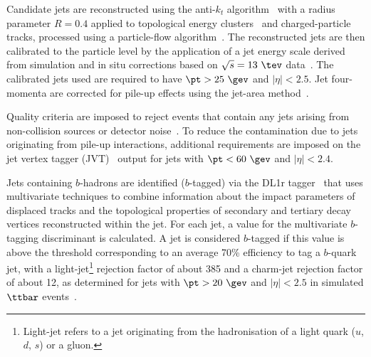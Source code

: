 \documentclass[PAPER, coverpage, atlasdraft=true, texlive=2016, UKenglish]{\ATLASLATEXPATH atlasdoc}
\begin{document}
Candidate jets are reconstructed using the anti-$k_t$ algorithm~\cite{Cacciari:2008gp,Cacciari:2005hq} with a
radius parameter $R=0.4$ applied to topological energy clusters~\cite{Aad:2016upy} and charged-particle tracks, processed using
a particle-flow algorithm~\cite{Aad:2017epj77}. %
The reconstructed jets are then calibrated to the particle level by the application of a jet energy scale 
derived from simulation and in situ corrections based on $\sqrt{s}=13~\tev$ data~\cite{Aaboud:2017jcu}. %
The calibrated jets used are required to have $\pt > 25~\gev$ and $|\eta| < 2.5$.
Jet four-momenta are corrected for pile-up effects using the jet-area method~\cite{Cacciari:2008gn}.

Quality criteria are imposed to reject events that contain any jets arising from non-collision sources
or detector noise~\cite{ATLAS-CONF-2015-029}.  To reduce the contamination due to jets originating from pile-up interactions,
additional requirements are imposed on the jet vertex tagger (JVT)~\cite{Aad:2015ina} output for jets with $\pt<60~\gev$ and $|\eta| < 2.4$.

Jets containing $b$-hadrons are identified ($b$-tagged) via the DL1r tagger~\cite{Aad:2019epj79,ATL-PHYS-PUB-2017-013} %
that uses multivariate techniques to combine information about the impact parameters of displaced tracks and the  topological properties 
of secondary and tertiary decay vertices reconstructed within the jet. For each jet, a value for the multivariate $b$-tagging discriminant is 
calculated. A jet is considered $b$-tagged if this value is above the threshold corresponding to
an average 70\% efficiency to tag a $b$-quark jet, with a light-jet\footnote{Light-jet refers to a jet originating from the hadronisation of a light quark ($u$, $d$, $s$) or a gluon.} rejection factor of about 385 and a charm-jet rejection factor of about 12, as determined for jets with
$\pt >20~\gev$ and $|\eta|<2.5$ in simulated $\ttbar$ events~\cite{Aad:2019epj79}.
\end{document}
